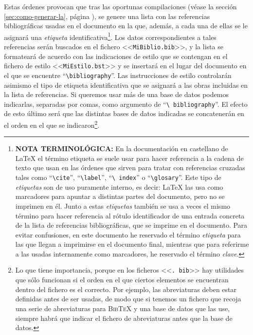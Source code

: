 \documentclass[a4paper,11pt]{article}
\def\btx-{\textsc{Bib\TeX}}
\def\ltx-{\LaTeX}
\def\ltr#1-{<<\texttt{#1}>>}
\def\tpf#1-{\ltr.#1-}
\def\cmd#1-{``\texttt{\textbackslash#1}''}
\begin{document}
\begin{enumerate}
  Estas  órdenes  provocan que  tras  las  oportunas  compilaciones (véase  la
  sección \ref{sec:como-generar-la}, página \pageref{sec:como-generar-la}), se
  genere una lista  con las referencias bibliográficas usadas  en el documento
  en la  que, además, a cada una  de ellas se le  asignará una \emph{etiqueta}
  identificativa\footnote{\textbf{NOTA TERMINOLÓGICA:}  En la documentación en
    castellano  de  \ltx-  el  término  etiqueta  se  suele  usar  para  hacer
    referencia a  la cadena de texto que  usan en las órdenes  que sirven para
    tratar con referencias  cruzadas tales como \cmd cite-,  \cmd label-, \cmd
    index-  o  \cmd  glosary-.   Este  tipo de  \emph{etiquetas}  son  de  uso
    puramente interno, es decir: \ltx-  las usa como marcadores para apuntar a
    distintas partes del documento, pero no  se imprimen en él.  Junto a estas
    \emph{etiquetas}  también se  usa  a  veces el  mismo  término para  hacer
    referencia al rótulo identificador de  una entrada concreta de la lista de
    referencias bibliográficas,  que se imprime en el  documento.  Para evitar
    confusiones,  en este  documento he  reservado el  término \emph{etiqueta}
    para las que llegan a imprimirse  en el documento final, mientras que para
    referirme  a las  usadas  internamente como  marcadores,  he reservado  el
    término \emph{clave}.  }.  Los  datos correspondientes a tales referencias
  serán buscados en el fichero \ltr MiBiblio.bib-, y la lista se formateará de
  acuerdo con  las indicaciones de  estilo que se  contengan en el  fichero de
  estilo \ltr MiEstilo.bst- y se insertará en el lugar del documento en el que
  se encuentre  \cmd bibliography-.   Las instrucciones de  estilo controlarán
  asimismo  el tipo de  etiqueta identificativa  que se  asignará a  las obras
  incluidas en  la lista de referencias. Si  queremos usar más de  una base de
  datos  podemos  indicarlas, separadas  por  comas,  como  argumento de  \cmd
  bibliography-.  El  efecto de  esto último será  que las distintas  bases de
  datos   indicadas   se   concatenerán   en   el   orden   en   el   que   se
  indicaron\footnote{Lo  que tiene  importancia, porque  en los  ficheros \tpf
    bib-  hay utilidades  que sólo  funcionan si  el orden  en el  que ciertos
    elementos se encuentran  dentro del fichero es el  correcto.  Por ejemplo,
    las abreviaturas deben estar definidas antes de ser usadas, de modo que si
    tenemos un fichero  que recoja una serie de abreviaturas  para \btx- y una
    base  de datos  que  las use,  siempre  habrá que  indicar  el fichero  de
    abreviaturas antes que la base de datos.}.

\end{enumerate}
\end{document}
